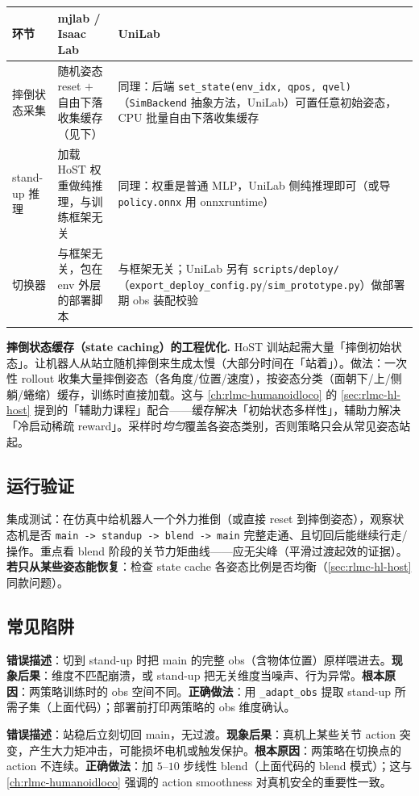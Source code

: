 \begin{center}
\small
\begin{tabular}{p{2.2cm}p{4.2cm}p{4.2cm}}
\hline
环节 & mjlab / Isaac Lab & UniLab \\
\hline
摔倒状态采集 & 随机姿态 reset $+$ 自由下落收集缓存（见下） & 同理：后端 \verb|set_state(env_idx, qpos, qvel)|（\texttt{SimBackend} 抽象方法，UniLab）可置任意初始姿态，CPU 批量自由下落收集缓存 \\
stand-up 推理 & 加载 HoST 权重做纯推理，与训练框架无关 & 同理：权重是普通 MLP，UniLab 侧纯推理即可（或导 \verb|policy.onnx| 用 onnxruntime） \\
切换器 & 与框架无关，包在 env 外层的部署脚本 & 与框架无关；UniLab 另有 \texttt{scripts/deploy/}（\verb|export_deploy_config.py|/\verb|sim_prototype.py|）做部署期 obs 装配校验\cite{unilab2026} \\
\hline
\end{tabular}
\end{center}

\begin{note}
\textbf{摔倒状态缓存（state caching）的工程优化.}\;
HoST 训站起需大量「摔倒初始状态」。让机器人从站立随机摔倒来生成太慢（大部分时间在「站着」）。做法：一次性 rollout 收集大量摔倒姿态（各角度/位置/速度），按姿态分类（面朝下/上/侧躺/蜷缩）缓存，训练时直接加载。这与 \cref{ch:rlmc-humanoidloco} 的 \cref{sec:rlmc-hl-host} 提到的「辅助力课程」配合——缓存解决「初始状态多样性」，辅助力解决「冷启动稀疏 reward」。采样时\emph{均匀}覆盖各姿态类别，否则策略只会从常见姿态站起。
\end{note}

\subsection{运行验证}
集成测试：在仿真中给机器人一个外力推倒（或直接 reset 到摔倒姿态），观察状态机是否 \verb|main -> standup -> blend -> main| 完整走通、且切回后能继续行走/操作。重点看 blend 阶段的关节力矩曲线——应无尖峰（平滑过渡起效的证据）。\textbf{若只从某些姿态能恢复}：检查 state cache 各姿态比例是否均衡（\cref{sec:rlmc-hl-host} 同款问题）。

\subsection{常见陷阱}
\begin{pitfall}
\textbf{错误描述}：切到 stand-up 时把 main 的完整 obs（含物体位置）原样喂进去。\textbf{现象后果}：维度不匹配崩溃，或 stand-up 把无关维度当噪声、行为异常。\textbf{根本原因}：两策略训练时的 obs 空间不同。\textbf{正确做法}：用 \verb|_adapt_obs| 提取 stand-up 所需子集（上面代码）；部署前打印两策略的 obs 维度确认。
\end{pitfall}
\begin{pitfall}
\textbf{错误描述}：站稳后立刻切回 main，无过渡。\textbf{现象后果}：真机上某些关节 action 突变，产生大力矩冲击，可能损坏电机或触发保护。\textbf{根本原因}：两策略在切换点的 action 不连续。\textbf{正确做法}：加 $5$--$10$ 步线性 blend（上面代码的 blend 模式）；这与 \cref{ch:rlmc-humanoidloco} 强调的 action smoothness 对真机安全的重要性一致。
\end{pitfall}

